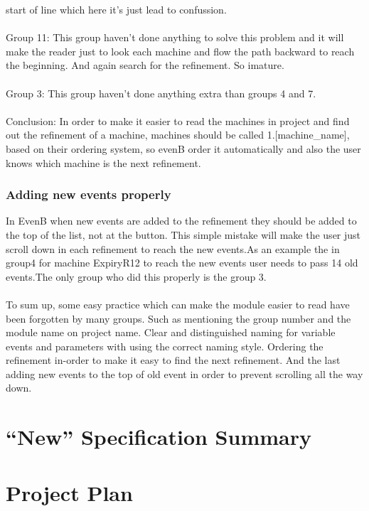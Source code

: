 start of line which here it's just lead to confussion.  \\ \\  Group 11: This group haven't done anything to solve this problem and it will make the reader just to look each machine and flow the path backward to reach the beginning. And again search for the refinement. So imature.  \\ \\  Group 3: This group haven't done anything extra than groups 4 and 7.  \\ \\  Conclusion: In order to make it easier to read the machines in project and find out the refinement of a machine, machines should be called 1.[machine\_name], based on their ordering system, so evenB order it automatically and also the user knows which machine is the next refinement. 

\subsection{Adding new events properly}
\label{addingneweventsproperly}

In EvenB when new events are added to the refinement they should be added to the top of the list, not at the button. This simple mistake will make the user just scroll down in each refinement to reach the new events.As an example the in group4 for machine ExpiryR12 to reach the new events user needs to pass 14 old events.The only group who did this properly is the group 3.  \\ \\  To sum up, some easy practice which can make the module easier to read have been forgotten by many groups. Such as mentioning the group number and the module name on project name. Clear and distinguished naming for variable events and parameters with using the correct naming style. Ordering the refinement in-order to make it easy to find the next refinement. And the last adding new events to the top of old event in order to prevent scrolling all the way down.

\chapter{``New'' Specification Summary}
\label{newspecificationsummary}

\chapter{Project Plan}
\label{projectplan}

